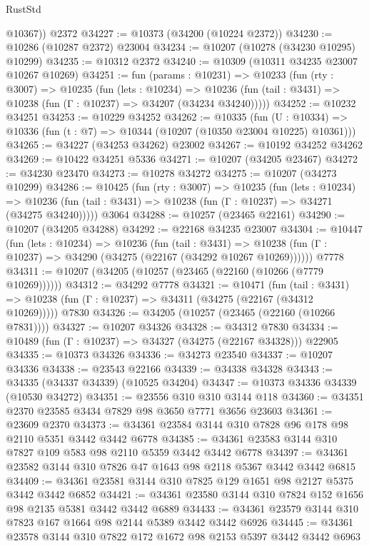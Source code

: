 \begin{lexlean}{RustStd}
\begin{coremodule}
        @10367))
    @2372
@34227 := @10373 (@34200 (@10224 @2372))
@34230 := @10286 (@10287 @2372) @23004
@34234 := @10207 (@10278 (@34230 @10295) @10299)
@34235 := @10312 @2372
@34240 := @10309 (@10311 @34235 @23007 @10267 @10269)
@34251 := fun (params : @10231) =>
  @10233
    (fun (rty : @3007) =>
    @10235
      (fun (lets : @10234) =>
      @10236 (fun (tail : @3431) => @10238 (fun (Γ : @10237) => @34207 (@34234 @34240)))))
@34252 := @10232 @34251
@34253 := @10229 @34252
@34262 := @10335
    (fun (U : @10334) => @10336 (fun (t : @7) => @10344 (@10207 (@10350 @23004 @10225) @10361)))
@34265 := @34227 (@34253 @34262) @23002
@34267 := @10192 @34252 @34262
@34269 := @10422 @34251 @5336
@34271 := @10207 (@34205 @23467)
@34272 := @34230 @23470
@34273 := @10278 @34272
@34275 := @10207 (@34273 @10299)
@34286 := @10425
    (fun (rty : @3007) =>
    @10235
      (fun (lets : @10234) =>
      @10236 (fun (tail : @3431) => @10238 (fun (Γ : @10237) => @34271 (@34275 @34240)))))
    @3064
@34288 := @10257 (@23465 @22161)
@34290 := @10207 (@34205 @34288)
@34292 := @22168 @34235 @23007
@34304 := @10447
    (fun (lets : @10234) =>
    @10236
      (fun (tail : @3431) =>
      @10238 (fun (Γ : @10237) => @34290 (@34275 (@22167 (@34292 @10267 @10269))))))
    @7778
@34311 := @10207 (@34205 (@10257 (@23465 (@22160 (@10266 (@7779 @10269))))))
@34312 := @34292 @7778
@34321 := @10471
    (fun (tail : @3431) => @10238 (fun (Γ : @10237) => @34311 (@34275 (@22167 (@34312 @10269)))))
    @7830
@34326 := @34205 (@10257 (@23465 (@22160 (@10266 @7831))))
@34327 := @10207 @34326
@34328 := @34312 @7830
@34334 := @10489 (fun (Γ : @10237) => @34327 (@34275 (@22167 @34328))) @22905
@34335 := @10373 @34326
@34336 := @34273 @23540
@34337 := @10207 @34336
@34338 := @23543 @22166
@34339 := @34338 @34328
@34343 := @34335 (@34337 @34339) (@10525 @34204)
@34347 := @10373 @34336 @34339 (@10530 @34272)
@34351 := @23556 @310 @310 @3144 @118
@34360 := @34351 @2370 @23585 @3434 @7829 @98 @3650 @7771 @3656 @23603
@34361 := @23609 @2370
@34373 := @34361 @23584 @3144 @310 @7828 @96 @178 @98 @2110 @5351 @3442 @3442 @6778
@34385 := @34361 @23583 @3144 @310 @7827 @109 @583 @98 @2110 @5359 @3442 @3442 @6778
@34397 := @34361 @23582 @3144 @310 @7826 @47 @1643 @98 @2118 @5367 @3442 @3442 @6815
@34409 := @34361 @23581 @3144 @310 @7825 @129 @1651 @98 @2127 @5375 @3442 @3442 @6852
@34421 := @34361 @23580 @3144 @310 @7824 @152 @1656 @98 @2135 @5381 @3442 @3442 @6889
@34433 := @34361 @23579 @3144 @310 @7823 @167 @1664 @98 @2144 @5389 @3442 @3442 @6926
@34445 := @34361 @23578 @3144 @310 @7822 @172 @1672 @98 @2153 @5397 @3442 @3442 @6963

\end{coremodule}
\end{lexlean}
